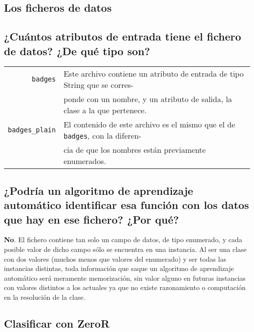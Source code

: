 \documentclass[12pt]{article}
\begin{document}
\tableofcontents

\newpage

\begin{center}
\section{Los ficheros de datos}
\end{center}

\subsection*{\small ¿Cuántos atributos de entrada tiene el fichero de datos? ¿De qué tipo son?}

\begin{tabular}{rl}
  \texttt{badges} & Este archivo contiene un atributo de entrada de tipo String que se corres- \\ &ponde con un nombre, y un atributo de salida, la clase a la que pertenece.\\
  \texttt{badges\_plain} & El contenido de este archivo es el mismo que el de \texttt{badges}, con la diferen- \\ &cia de que los nombres están previamente enumerados.
\end{tabular}

\subsection*{\small ¿Podría un algoritmo de aprendizaje automático identificar
esa función con los datos que hay en ese fichero? ¿Por qué?}

\textbf{No}. El fichero contiene tan solo un campo de datos, de tipo enumerado,
y cada posible valor de dicho campo sólo se encuentra en una instancia. Al ser
una clase con dos valores (muchos menos que valores del enumerado) y ser todas
las instancias distintas, toda información que saque un algoritmo de aprendizaje
automático será meramente memorización, sin valor alguno en futuras instancias
con valores distintos a los actuales ya que no existe razonamiento o
computación en la resolución de la clase.

\newpage

\begin{center}
\section{Clasificar con ZeroR}
\end{center}
\end{document}
